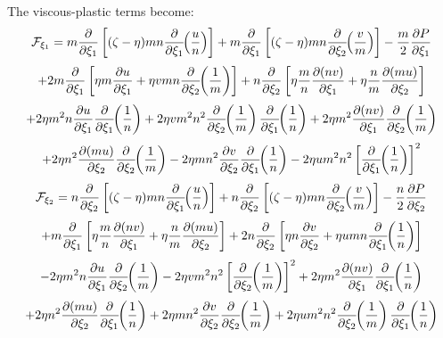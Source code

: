The viscous-plastic terms become:
\[
   {\cal F}_{\xi_1} = m {\partial \over \partial \xi_1} \left[
   (\zeta - \eta ) mn {\partial \over \partial \xi_1} \!\! \left(
   {u \over n} \right) \right] +
   m {\partial \over \partial \xi_1} \left[
   (\zeta - \eta ) mn {\partial \over \partial \xi_2} \!\! \left(
   {v \over m} \right) \right] - {m \over 2}
   {\partial P \over \partial \xi_1}
\]
\[
   + 2 m {\partial \over \partial \xi_1} \left[ \eta m
   {\partial u \over \partial \xi_1} + \eta v mn 
   {\partial \over \partial \xi_2} \!\! \left( {1 \over m} \right)
   \right]
   + n {\partial \over \partial \xi_2} \left[ \eta {m \over n}
   {\partial (nv) \over \partial \xi_1} + \eta {n \over m}
   {\partial (mu) \over \partial \xi_2} \right]
\]
\[
   + 2 \eta m^2 n {\partial u \over \partial \xi_1}
   {\partial \over \partial \xi_1} \!\! \left( {1 \over n} \right)
   + 2 \eta v m^2 n^2
   {\partial \over \partial \xi_2} \!\! \left( {1 \over m} \right)
   {\partial \over \partial \xi_1} \!\! \left( {1 \over n} \right)
   + 2 \eta m^2 {\partial (nv) \over \partial \xi_1}
   {\partial \over \partial \xi_2} \!\! \left( {1 \over m} \right)
\]
\begin{equation}
   + 2 \eta n^2 {\partial (mu) \over \partial \xi_2}
   {\partial \over \partial \xi_2} \!\! \left( {1 \over m} \right)
   - 2 \eta m n^2 {\partial v \over \partial \xi_2}
   {\partial \over \partial \xi_1} \!\! \left( {1 \over n} \right)
   - 2 \eta u m^2 n^2 \left[
   {\partial \over \partial \xi_1} \!\! \left( {1 \over n} \right)
   \right]^2
\end{equation}
\vspace{2 mm}
\[
   {\cal F}_{\xi_2} = n {\partial \over \partial \xi_2} \left[
   (\zeta - \eta ) mn {\partial \over \partial \xi_1} \!\! \left(
   {u \over n} \right) \right] +
   n {\partial \over \partial \xi_2} \left[
   (\zeta - \eta ) mn {\partial \over \partial \xi_2} \!\! \left(
   {v \over m} \right) \right] - {n \over 2}
   {\partial P \over \partial \xi_2}
\]
\[
   + m {\partial \over \partial \xi_1} \left[ \eta {m \over n}
   {\partial (nv) \over \partial \xi_1} + \eta {n \over m}
   {\partial (mu) \over \partial \xi_2} \right]
   + 2n {\partial \over \partial \xi_2} \left[ \eta n
   {\partial v \over \partial \xi_2} + \eta u mn 
   {\partial \over \partial \xi_1} \!\! \left( {1 \over n} \right)
   \right]
\]
\[
   - 2 \eta m^2 n {\partial u \over \partial \xi_1}
   {\partial \over \partial \xi_2} \!\! \left( {1 \over m} \right)
   - 2 \eta v m^2 n^2 \left[
   {\partial \over \partial \xi_2} \!\! \left( {1 \over m} \right)
   \right]^2
   + 2 \eta m^2 {\partial (nv) \over \partial \xi_1}
   {\partial \over \partial \xi_1} \!\! \left( {1 \over n} \right)
\]
\begin{equation}
   + 2 \eta n^2 {\partial (mu) \over \partial \xi_2}
   {\partial \over \partial \xi_1} \!\! \left( {1 \over n} \right)
   + 2 \eta m n^2 {\partial v \over \partial \xi_2}
   {\partial \over \partial \xi_2} \!\! \left( {1 \over m} \right)
   + 2 \eta u m^2 n^2
   {\partial \over \partial \xi_2} \!\! \left( {1 \over m} \right)
   {\partial \over \partial \xi_1} \!\! \left( {1 \over n} \right)
\end{equation}

